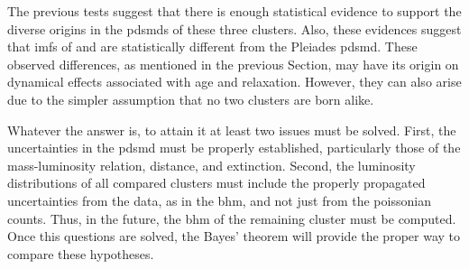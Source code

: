 The previous tests suggest that there is enough statistical evidence  to support the diverse origins in the \glspl{pdsmd} of these three clusters. Also, these evidences suggest that \glspl{imf} of \citet{Chabrier2005} and \citet{Thies2007} are statistically different from the  Pleiades \gls{pdsmd}.  These observed differences, as mentioned in the previous Section, may have its origin on dynamical effects associated with age and relaxation. However, they can also arise due to the simpler assumption that no two clusters are born alike.

Whatever the answer is, to attain it at least two issues must be solved. First, the uncertainties in the \gls{pdsmd} must be properly established, particularly those of the mass-luminosity relation, distance, and extinction. Second, the luminosity distributions of all compared clusters must include the properly propagated uncertainties from the data, as in the \gls{bhm}, and not just from the poissonian counts. Thus, in the future, the \gls{bhm} of the remaining cluster must be computed. Once this questions are solved, the Bayes' theorem will provide the proper way to compare these hypotheses. 
 




